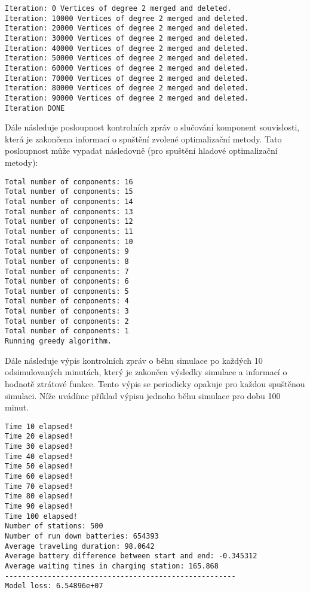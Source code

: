 \begin{Verbatim}
Iteration: 0 Vertices of degree 2 merged and deleted.
Iteration: 10000 Vertices of degree 2 merged and deleted.
Iteration: 20000 Vertices of degree 2 merged and deleted.
Iteration: 30000 Vertices of degree 2 merged and deleted.
Iteration: 40000 Vertices of degree 2 merged and deleted.
Iteration: 50000 Vertices of degree 2 merged and deleted.
Iteration: 60000 Vertices of degree 2 merged and deleted.
Iteration: 70000 Vertices of degree 2 merged and deleted.
Iteration: 80000 Vertices of degree 2 merged and deleted.
Iteration: 90000 Vertices of degree 2 merged and deleted.
Iteration DONE
\end{Verbatim}


Dále následuje posloupnost kontrolních zpráv o slučování komponent 
souvislosti, která je zakončena informací o spuštění zvolené optimalizační metody. 
Tato posloupnost může vypadat následovně (pro spuštění hladové optimalizační
metody):

\begin{Verbatim}
Total number of components: 16
Total number of components: 15
Total number of components: 14
Total number of components: 13
Total number of components: 12
Total number of components: 11
Total number of components: 10
Total number of components: 9
Total number of components: 8
Total number of components: 7
Total number of components: 6
Total number of components: 5
Total number of components: 4
Total number of components: 3
Total number of components: 2
Total number of components: 1
Running greedy algorithm.
\end{Verbatim}

Dále následuje výpis kontrolních zpráv o běhu simulace po každých 
10 odsimulovaných minutách, který je zakončen výsledky simulace a informací
o hodnotě ztrátové funkce. Tento výpis se periodicky opakuje pro každou
spuštěnou simulaci. 
Níže uvádíme příklad výpisu jednoho běhu simulace pro dobu 100 minut.

\begin{Verbatim}
Time 10 elapsed!
Time 20 elapsed!
Time 30 elapsed!
Time 40 elapsed!
Time 50 elapsed!
Time 60 elapsed!
Time 70 elapsed!
Time 80 elapsed!
Time 90 elapsed!
Time 100 elapsed!
Number of stations: 500
Number of run down batteries: 654393
Average traveling duration: 98.0642
Average battery difference between start and end: -0.345312
Average waiting times in charging station: 165.868
------------------------------------------------------
Model loss: 6.54896e+07
\end{Verbatim}


